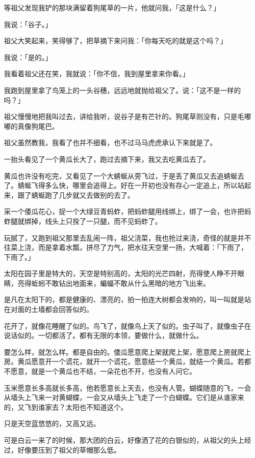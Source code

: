 \documentclass[UTF8]{ctexart}
\begin{document}
等祖父发现我铲的那块满留着狗尾草的一片，他就问我，「这是什么？」

我说：「谷子。」

祖父大笑起来，笑得够了，把草摘下来问我：「你每天吃的就是这个吗？」

我说：「是的。」

我看着祖父还在笑，我就说：「你不信，我到屋里拿来你看。」

我跑到屋里拿了鸟笼上的一头谷穗，远远地就抛给祖父了。说：「这不是一样的吗？」

祖父慢慢地把我叫过去，讲给我听，说谷子是有芒针的。狗尾草则没有，只是毛嘟嘟的真像狗尾巴。

祖父虽然教我，我看了也并不细看，也不过马马虎虎承认下来就是了。

一抬头看见了一个黄瓜长大了，跑过去摘下来，我又去吃黄瓜去了。

黄瓜也许没有吃完，又看见了一个大蜻蜒从旁飞过，于是丢了黄瓜又去追蜻蜒去了。蜻蜒飞得多么快，哪里会追得上。好在一开初也没有存心一定追上，所以站起来，跟了蜻蜒跑了几步就又去做别的去了。

采一个倭瓜花心，捉一个大绿豆青蚂蚱，把蚂蚱腿用线绑上，绑了一会，也许把蚂蚱腿就绑掉，线头上只拴了一只腿，而不见蚂蚱了。

玩腻了，又跑到祖父那里去乱闹一阵，祖父浇菜，我也抢过来浇，奇怪的就是并不往菜上浇，而是拿着水瓢，拼尽了力气，把水往天空里一扬，大喊着：「下雨了，下雨了。」

太阳在园子里是特大的，天空是特别高的，太阳的光芒四射，亮得使人睁不开眼睛，亮得蚯蚓不敢钻出地面来，蝙蝠不敢从什么黑暗的地方飞出来。

是凡在太阳下的，都是健康的、漂亮的，拍一拍连大树都会发响的，叫一叫就是站在对面的土墙都会回答似的。

花开了，就像花睡醒了似的。鸟飞了，就像鸟上天了似的。虫子叫了，就像虫子在说话似的。一切都活了。都有无限的本领，要做什么，就做什么。

要怎么样，就怎么样。都是自由的。倭瓜愿意爬上架就爬上架，愿意爬上房就爬上房。黄瓜愿意开一个谎花，就开一个谎花，愿意结一个黄瓜，就结一个黄瓜。若都不愿意，就是一个黄瓜也不结，一朵花也不开，也没有人问它。

玉米愿意长多高就长多高，他若愿意长上天去，也没有人管。蝴蝶随意的飞，一会从墙头上飞来一对黄蝴蝶，一会又从墙头上飞走了一个白蝴蝶。它们是从谁家来的，又飞到谁家去？太阳也不知道这个。

只是天空蓝悠悠的，又高又远。

可是白云一来了的时候，那大团的白云，好像洒了花的白银似的，从祖父的头上经过，好像要压到了祖父的草帽那么低。
\end{document}
